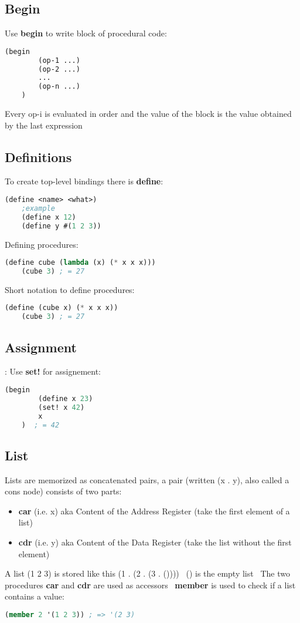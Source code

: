 \subsection{Begin}
Use \textbf{begin} to write block of procedural code:
\begin{lstlisting}[language=Lisp]
    (begin
        (op-1 ...)
        (op-2 ...)
        ...
        (op-n ...)
    )
\end{lstlisting}

Every op-i is evaluated in order and the value of the block is the value obtained by the last expression

\subsection{Definitions}
To create top-level bindings there is \textbf{define}:
\begin{lstlisting}[language=Lisp]
    (define <name> <what>)
    ;example
    (define x 12)
    (define y #(1 2 3))
\end{lstlisting}
Defining procedures:
\begin{lstlisting}[language=Lisp]
    (define cube (lambda (x) (* x x x)))
    (cube 3) ; = 27
\end{lstlisting}
Short notation to define procedures:
\begin{lstlisting}[language=Lisp]
    (define (cube x) (* x x x))
    (cube 3) ; = 27
\end{lstlisting}

\subsection{Assignment}:
Use \textbf{set!} for assignement:
\begin{lstlisting}[language=Lisp]
    (begin
        (define x 23)
        (set! x 42)
        x
    )  ; = 42
\end{lstlisting}

\subsection{List}
Lists are memorized as concatenated pairs, a pair (written (x . y), also called a cons node) consists of two parts:
\begin{itemize}
    \item \textbf{car} (i.e. x) aka Content of the Address Register (take the first element of a list)
    \item \textbf{cdr} (i.e. y) aka Content of the Data Register (take the list without the first element)
\end{itemize}
A list (1 2 3) is stored like this (1 . (2 . (3 . ()))) \
() is the empty list \
The two procedures \textbf{car} and \textbf{cdr} are used as accessors \
\textbf{member} is used to check if a list contains a value:
\begin{lstlisting}[language=Lisp]
    (member 2 '(1 2 3)) ; => '(2 3)
\end{lstlisting}

